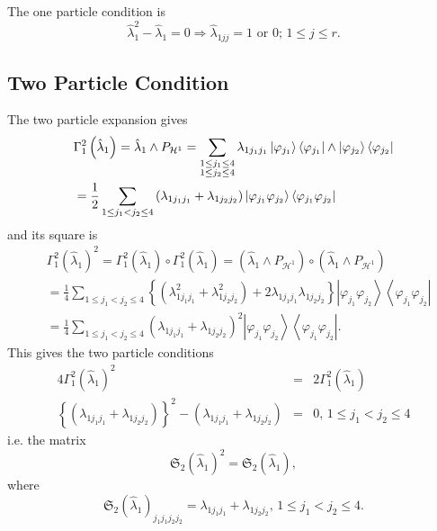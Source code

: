 \documentclass[12pt]{article}
\begin{document}
The one particle condition is 
\begin{equation*}
\hat{\lambda}_{1}^{2}-\hat{\lambda}_{1}=0\Rightarrow \hat{\lambda}_{1jj}=1%
\text{ or }0;\,1\leq j\leq r. 
\end{equation*}

\subsection{Two Particle Condition}

The two particle expansion gives 
\begin{align*}
& \Gamma _{1}^{2}\left( \hat{\lambda}_{1}\right) =\hat{\lambda}_{1}\wedge P_{%
\mathcal{H}^{1}}=\sum_{\substack{ 1\leq j_{1}\leq 4  \\ 1\leq j_{2}\leq 4}}%
\lambda _{1j_{1}j_{1}}\left\vert \varphi _{j_{1}}\right\rangle \left\langle
\varphi _{j_{1}}\right\vert \wedge \left\vert \varphi _{j_{2}}\right\rangle
\left\langle \varphi _{j_{2}}\right\vert \\
& =\frac{1}{2}\sum_{1\leq j_{1}<j_{2}\leq 4}\left( \lambda
_{1j_{1}j_{1}}+\lambda _{1j_{2}j_{2}}\right) \left\vert \varphi
_{j_{1}}\varphi _{j_{2}}\right\rangle \left\langle \varphi _{j_{1}}\varphi
_{j_{2}}\right\vert
\end{align*}%
and its square is 
\begin{align*}
& \Gamma _{1}^{2}\left( \hat{\lambda}_{1}\right) ^{2}=\Gamma _{1}^{2}\left( 
\hat{\lambda}_{1}\right) \circ \Gamma _{1}^{2}\left( \hat{\lambda}%
_{1}\right) =\left( \hat{\lambda}_{1}\wedge P_{\mathcal{H}^{1}}\right) \circ
\left( \hat{\lambda}_{1}\wedge P_{\mathcal{H}^{1}}\right) \\
& =\frac{1}{4}\sum_{1\leq j_{1}<j_{2}\leq 4}\left\{ \left( \lambda
_{1j_{1}j_{1}}^{2}+\lambda _{1j_{2}j_{2}}^{2}\right) \right. +\left.
2\lambda _{1j_{1}j_{1}}\lambda _{1j_{2}j_{2}}\right\} \left\vert \varphi
_{j_{1}}\varphi _{j_{2}}\right\rangle \left\langle \varphi _{j_{1}}\varphi
_{j_{2}}\right\vert \\
& =\frac{1}{4}\sum_{1\leq j_{1}<j_{2}\leq 4}\left( \lambda
_{1j_{1}j_{1}}+\lambda _{1j_{2}j_{2}}\right) ^{2}\left\vert \varphi
_{j_{1}}\varphi _{j_{2}}\right\rangle \left\langle \varphi _{j_{1}}\varphi
_{j_{2}}\right\vert .
\end{align*}%
This gives the two particle conditions%
\begin{eqnarray*}
4\Gamma _{1}^{2}\left( \hat{\lambda}_{1}\right) ^{2} &=&2\Gamma
_{1}^{2}\left( \hat{\lambda}_{1}\right) \\
\left\{ \left( \lambda _{1j_{1}j_{1}}+\lambda _{1j_{2}j_{2}}\right) \right\}
^{2}-\left( \lambda _{1j_{1}j_{1}}+\lambda _{1j_{2}j_{2}}\right)
&=&0,\,1\leq j_{1}<j_{2}\leq 4
\end{eqnarray*}%
i.e. the matrix 
\begin{equation*}
\mathfrak{S}_{2}\left( \hat{\lambda}_{1}\right) ^{2}=\mathfrak{S}_{2}\left( 
\hat{\lambda}_{1}\right) , 
\end{equation*}%
where 
\begin{equation*}
\mathfrak{S}_{2}\left( \hat{\lambda}_{1}\right)
_{j_{1}j_{1}j_{2}j_{2}}=\lambda _{1j_{1}j_{1}}+\lambda
_{1j_{2}j_{2}},\,1\leq j_{1}<j_{2}\leq 4. 
\end{equation*}
\end{document}
